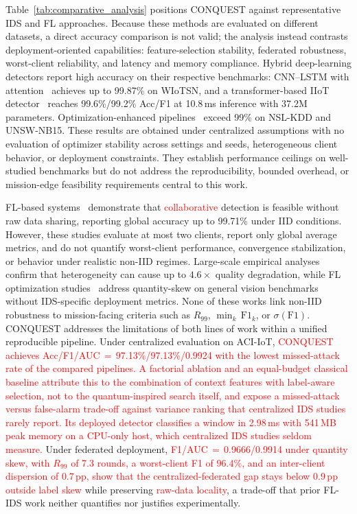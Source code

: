 \documentclass[conference]{IEEEtran}
\begin{document}
Table~\ref{tab:comparative_analysis} positions CONQUEST against
representative IDS and FL approaches. Because these methods are
evaluated on different datasets, a direct accuracy comparison is not
valid; the analysis instead contrasts deployment-oriented
capabilities: feature-selection stability, federated robustness,
worst-client reliability, and latency and memory compliance.
Hybrid deep-learning detectors report high accuracy on their
respective benchmarks: CNN--LSTM with
attention~\cite{phalaagaehybrid} achieves up to 99.87\% on
WIoTSN, and a transformer-based IIoT
detector~\cite{yuadaptive} reaches 99.6\%/99.2\% Acc/F1 at
10.8\,ms inference with 37.2M parameters.
Optimization-enhanced pipelines~\cite{donkoloptimization,shrivashybrid}
exceed 99\% on NSL-KDD and UNSW-NB15. These results are
obtained under centralized assumptions with no evaluation of
optimizer stability across settings and seeds, heterogeneous client behavior,
or deployment constraints. They establish performance
ceilings on well-studied benchmarks but do not address the
reproducibility, bounded overhead, or mission-edge feasibility
requirements central to this work.



FL-based systems~\cite{FRIHA202217,herlambangfederated}
demonstrate that \textcolor{red}{collaborative} detection is feasible
without raw data sharing, reporting global accuracy up to
99.71\% under IID conditions. However, these studies evaluate
at most two clients, report only global average metrics, and
do not quantify worst-client performance, convergence
stabilization, or behavior under realistic non-IID regimes.
Large-scale empirical analyses~\cite{abdelmoniemcomprehensive}
confirm that heterogeneity can cause up to $4.6\times$ quality
degradation, while FL optimization
studies~\cite{gefedamkd} address quantity-skew on general
vision benchmarks without IDS-specific deployment metrics.
None of these works link non-IID robustness to
mission-facing criteria such as $R_{99}$,
$\min_k\,\mathrm{F1}_k$, or $\sigma(\mathrm{F1})$.
CONQUEST addresses the limitations of both lines of work
within a unified reproducible pipeline. Under centralized
evaluation on ACI-IoT, \textcolor{red}{CONQUEST achieves
Acc/F1/AUC\,$=$\,97.13\%/97.13\%/0.9924 with the lowest
missed-attack rate of the compared pipelines. A factorial
ablation and an equal-budget classical baseline attribute this to
the combination of context features with label-aware selection,
not to the quantum-inspired search itself, and expose a
missed-attack versus false-alarm trade-off against variance
ranking that centralized IDS studies rarely report.}
\textcolor{red}{Its deployed detector classifies a window in
2.98\,ms with 541\,MB peak memory on a CPU-only host, which
centralized IDS studies seldom measure.}
Under federated deployment,
\textcolor{red}{F1/AUC\,$=$\,0.9666/0.9914 under quantity skew, with
$R_{99}$ of 7.3 rounds, a worst-client F1 of $96.4\%$, and an
inter-client dispersion of $0.7$\,pp, show that the
centralized-federated gap stays below 0.9\,pp outside label skew}
while preserving \textcolor{red}{raw-data locality}, a trade-off that
prior FL-IDS work neither quantifies nor justifies
experimentally.
\end{document}
